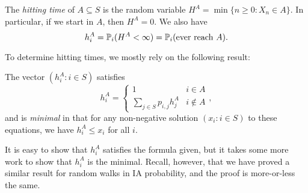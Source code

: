 \documentclass[a4paper]{article}
\begin{document}
\begin{defi}
  The \emph{hitting time} of $A \subseteq S$ is the random variable $H^A = \min\{n \geq 0: X_n \in A\}$. In particular, if we start in $A$, then $H^A = 0$. We also have
  \[
    h_i^A = \P_i(H^A < \infty) = \P_i(\text{ever reach }A).
  \]
\end{defi}

To determine hitting times, we mostly rely on the following result:
\begin{thm}
  The vector $(h_i^A: i \in S)$ satisfies
  \[
    h_i^A =
    \begin{cases}
      1 & i \in A\\
      \sum_{j \in S}p_{i, j}h_j^A & i \not \in A
    \end{cases},
  \]
  and is \emph{minimal} in that for any non-negative solution $(x_i: i \in S)$ to these equations, we have $h_i^A \leq x_i$ for all $i$.
\end{thm}
It is easy to show that $h_i^A$ satisfies the formula given, but it takes some more work to show that $h_i^A$ is the minimal. Recall, however, that we have proved a similar result for random walks in IA probability, and the proof is more-or-less the same.
\end{document}
